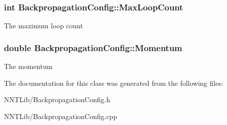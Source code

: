 \subsubsection[{Max\+Loop\+Count}]{\setlength{\rightskip}{0pt plus 5cm}int Backpropagation\+Config\+::\+Max\+Loop\+Count}\label{class_backpropagation_config_a5f13785a5b5451815c46fa475af82fac}


The maximum loop count 

\hypertarget{class_backpropagation_config_a8b108e7cddcbf2cc103b813708057487}{}
\subsubsection[{Momentum}]{\setlength{\rightskip}{0pt plus 5cm}double Backpropagation\+Config\+::\+Momentum}\label{class_backpropagation_config_a8b108e7cddcbf2cc103b813708057487}


The momentum 



The documentation for this class was generated from the following files\+:\begin{DoxyCompactItemize}
\item 
N\+N\+T\+Lib/Backpropagation\+Config.\+h\item 
N\+N\+T\+Lib/Backpropagation\+Config.\+cpp\end{DoxyCompactItemize}
